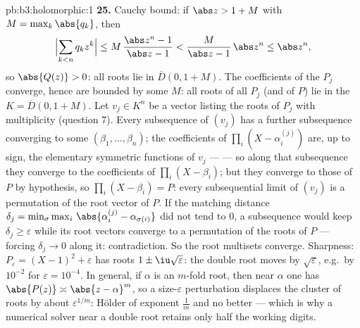 \begin{solution}{pb:b3:holomorphic:1}
\textbf{25.} Cauchy bound: if $\abs z > 1 + M$ with $M =
\max_k\abs{q_k}$, then
\[
\Bigl|\sum_{k<n}q_kz^k\Bigr|
\leq M\,\frac{\abs z^n - 1}{\abs z - 1}
< \frac{M}{\abs z - 1}\,\abs z^n \leq \abs z^n,
\]
so $\abs{Q(z)} > 0$: all roots lie in $\overline D(0, 1+M)$.
The coefficients of the $P_j$ converge, hence are bounded by
some $M$: all roots of all $P_j$ (and of $P$) lie in the
 $K = \overline D(0, 1 + M)$. Let $v_j \in K^n$ be a
vector listing the roots of $P_j$ with multiplicity
(question 7). Every subsequence of $(v_j)$ has a further
subsequence converging to some $(\beta_1, \dots, \beta_n)$;
the coefficients of $\prod_i(X - \alpha_i^{(j)})$ are, up to
sign, the elementary symmetric functions of $v_j$ ---
 --- so along that subsequence they converge to
the coefficients of $\prod_i(X - \beta_i)$; but they
converge to those of $P$ by hypothesis, so $\prod_i(X -
\beta_i) = P$: every subsequential limit of $(v_j)$ is a
permutation of the root vector of $P$. If the matching
distance $\delta_j = \min_\sigma\max_i\,
\abs{\alpha_i^{(j)} - \alpha_{\sigma(i)}}$ did not tend to
$0$, a subsequence would keep $\delta_j \geq \varepsilon$
while its root vectors converge to a permutation of the
roots of $P$ --- forcing $\delta_j \to 0$ along it:
contradiction. So the root multisets converge. Sharpness:
$P_\varepsilon = (X - 1)^2 + \varepsilon$ has roots $1 \pm
\iu\sqrt\varepsilon$: the double root moves by
$\sqrt\varepsilon$, e.g.\ by $10^{-2}$ for $\varepsilon =
10^{-4}$. In general, if $\alpha$ is an $m$-fold root, then
near $\alpha$ one has $\abs{P(z)} \asymp \abs{z -
\alpha}^m$, so a size-$\varepsilon$ perturbation displaces
the cluster of roots by about $\varepsilon^{1/m}$: H\"older
 of exponent $\frac1m$ and no better --- which is
why a numerical solver near a double root retains only half
the working digits.
\end{solution}
